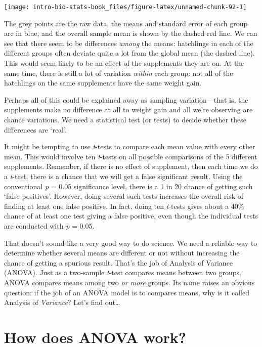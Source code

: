 \documentclass[
]{book}
\begin{document}
\begin{center}\texttt{[image: intro-bio-stats-book\_files/figure-latex/unnamed-chunk-92-1]} \end{center}

The grey points are the raw data, the means and standard error of each group are in blue, and the overall sample mean is shown by the dashed red line. We can see that there seem to be differences \emph{among} the means: hatchlings in each of the different groups often deviate quite a lot from the global mean (the dashed line). This would seem likely to be an effect of the supplements they are on. At the same time, there is still a lot of variation \emph{within} each group: not all of the hatchlings on the same supplements have the same weight gain.

Perhaps all of this could be explained away as sampling variation---that is, the supplements make no difference at all to weight gain and all we're observing are chance variations. We need a statistical test (or tests) to decide whether these differences are `real'.

It might be tempting to use \emph{t}-tests to compare each mean value with every other mean. This would involve ten \emph{t}-tests on all possible comparisons of the 5 different supplements. Remember, if there is no effect of supplement, then each time we do a \emph{t}-test, there is a chance that we will get a false significant result. Using the conventional \emph{p} = 0.05 significance level, there is a 1 in 20 chance of getting such `false positives'. However, doing several such tests increases the overall risk of finding at least one false positive. In fact, doing ten \emph{t}-tests gives about a 40\% chance of at least one test giving a false positive, even though the individual tests are conducted with \emph{p} = 0.05.

That doesn't sound like a very good way to do science. We need a reliable way to determine whether several means are different or not without increasing the chance of getting a spurious result. That's the job of Analysis of Variance (ANOVA). Just as a two-sample \emph{t}-test compares means between two groups, ANOVA compares means among two \emph{or more} groups. Its name raises an obvious question: if the job of an ANOVA model is to compares means, why is it called Analysis of \emph{Variance}? Let's find out\ldots{}

\hypertarget{how-does-anova-work}{%
\section{How does ANOVA work?}\label{how-does-anova-work}}
\end{document}
